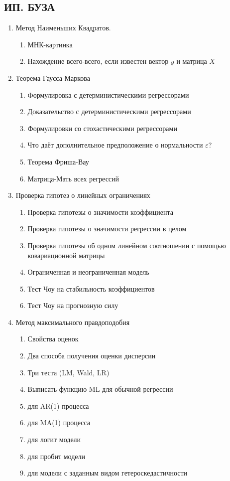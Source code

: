 \documentclass[12pt, a4paper]{article}\usepackage[]{graphicx}\usepackage[]{color}
\begin{document}
\subsection{ИП. БУЗА}


\begin{enumerate}

\item Метод Наименьших Квадратов.

\begin{enumerate}
\item МНК-картинка
\item Нахождение всего-всего, если известен вектор $y$ и матрица $X$
  \end{enumerate}

\item Теорема Гаусса-Маркова
\begin{enumerate}
\item Формулировка с детерминистическими регрессорами
\item Доказательство с детерминистическими регрессорами
\item Формулировки со стохастическими регрессорами
\item Что даёт дополнительное предположение о нормальности $\varepsilon$?
\item Теорема Фриша-Вау
\item Матрица-Мать всех регрессий
\end{enumerate}

\item Проверка гипотез о линейных ограничениях
\begin{enumerate}
\item Проверка гипотезы о значимости коэффициента
\item Проверка гипотезы о значимости регрессии в целом
\item Проверка гипотезы об одном линейном соотношении с помощью ковариационной матрицы
\item Ограниченная и неограниченная модель
\item Тест Чоу на стабильность коэффициентов
\item Тест Чоу на прогнозную силу
\end{enumerate}

\item Метод максимального правдоподобия

\begin{enumerate}
\item Свойства оценок
\item Два способа получения оценки дисперсии
\item Три теста (LM, Wald, LR)
\item Выписать функцию ML для обычной регрессии
\item для AR(1) процесса
\item для MA(1) процесса
\item для логит модели
\item для пробит модели
\item для модели с заданным видом гетероскедастичности
\end{enumerate}


\end{enumerate}
\end{document}
